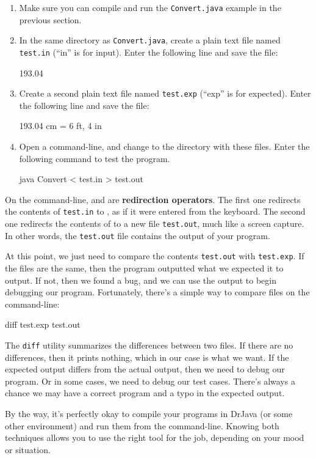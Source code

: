\begin{enumerate}

\item Make sure you can compile and run the {\tt Convert.java} example in the previous section.

\item In the same directory as {\tt Convert.java}, create a plain text file named {\tt test.in} (``in'' is for input).
Enter the following line and save the file:

\begin{stdout}
193.04
\end{stdout}

\item Create a second plain text file named {\tt test.exp} (``exp'' is for expected).
Enter the following line and save the file:

\begin{stdout}
193.04 cm = 6 ft, 4 in
\end{stdout}

\item Open a command-line, and change to the directory with these files.
Enter the following command to test the program.

\begin{stdout}
java Convert < test.in > test.out
\end{stdout}

\end{enumerate}

On the command-line, \java{<} and \java{>} are {\bf redirection operators}.
The first one redirects the contents of {\tt test.in} to , as if it were entered from the keyboard.
The second one redirects the contents of  to a new file {\tt test.out}, much like a screen capture.
In other words, the {\tt test.out} file contains the output of your program.

At this point, we just need to compare the contents {\tt test.out} with {\tt test.exp}.
If the files are the same, then the program outputted what we expected it to output.
If not, then we found a bug, and we can use the output to begin debugging our program.
Fortunately, there's a simple way to compare files on the command-line:

\begin{stdout}
diff test.exp test.out
\end{stdout}

The {\tt diff} utility summarizes the differences between two files.
If there are no differences, then it prints nothing, which in our case is what we want.
If the expected output differs from the actual output, then we need to debug our program.
Or in some cases, we need to debug our test cases.
There's always a chance we may have a correct program and a typo in the expected output.

By the way, it's perfectly okay to compile your programs in DrJava (or some other environment) and run them from the command-line.
Knowing both techniques allows you to use the right tool for the job, depending on your mood or situation.

